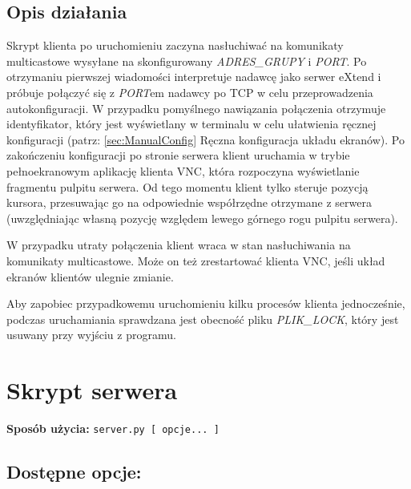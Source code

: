   \subsection{Opis działania}
    Skrypt klienta po uruchomieniu zaczyna nasłuchiwać na komunikaty multicastowe wysyłane na skonfigurowany \emph{ADRES\_GRUPY} i \emph{PORT}. Po otrzymaniu pierwszej wiadomości interpretuje nadawcę jako serwer eXtend i próbuje połączyć się z \emph{PORT}em nadawcy po TCP w celu przeprowadzenia autokonfiguracji. W przypadku pomyślnego nawiązania połączenia otrzymuje identyfikator, który jest wyświetlany w terminalu w celu ułatwienia ręcznej konfiguracji (patrz: \ref{sec:ManualConfig} Ręczna konfiguracja układu ekranów). Po zakończeniu konfiguracji po stronie serwera klient uruchamia w trybie pełnoekranowym aplikację klienta VNC, która rozpoczyna wyświetlanie fragmentu pulpitu serwera. Od tego momentu klient tylko steruje pozycją kursora, przesuwając go na odpowiednie współrzędne otrzymane z serwera (uwzględniając własną pozycję względem lewego górnego rogu pulpitu serwera).

    W przypadku utraty połączenia klient wraca w stan nasłuchiwania na komunikaty multicastowe. Może on też zrestartować klienta VNC, jeśli układ ekranów klientów ulegnie zmianie.

    Aby zapobiec przypadkowemu uruchomieniu kilku procesów klienta jednocześnie, podczas uruchamiania sprawdzana jest obecność pliku \emph{PLIK\_LOCK}, który jest usuwany przy wyjściu z programu.


\section{Skrypt serwera}

  \textbf{Sposób użycia:}
  \texttt{server.py [ opcje... ]}

  \subsection{Dostępne opcje:}

